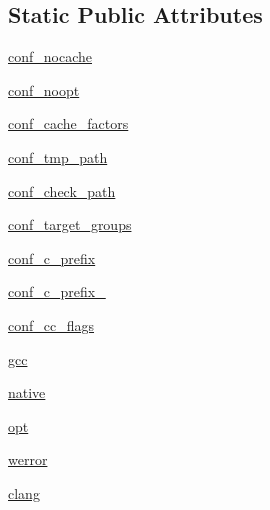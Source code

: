 \subsection*{Static Public Attributes}
\begin{DoxyCompactItemize}
\item 
\hyperlink{classnumpy_1_1distutils_1_1ccompiler__opt_1_1__Config_adad93aadb13906d28d4e25471d1e56f7}{conf\+\_\+nocache}
\item 
\hyperlink{classnumpy_1_1distutils_1_1ccompiler__opt_1_1__Config_a1d68534c2dbc6347af18677ea9754cda}{conf\+\_\+noopt}
\item 
\hyperlink{classnumpy_1_1distutils_1_1ccompiler__opt_1_1__Config_aa470e6069d1d9c574db056618517f95b}{conf\+\_\+cache\+\_\+factors}
\item 
\hyperlink{classnumpy_1_1distutils_1_1ccompiler__opt_1_1__Config_a6b6fb7f436d9313e96e8ed859c8d65b4}{conf\+\_\+tmp\+\_\+path}
\item 
\hyperlink{classnumpy_1_1distutils_1_1ccompiler__opt_1_1__Config_ad027d68dd3fd12a9d8e50ffe74201df3}{conf\+\_\+check\+\_\+path}
\item 
\hyperlink{classnumpy_1_1distutils_1_1ccompiler__opt_1_1__Config_a9c400a58b8140c1ff060a407017ed27d}{conf\+\_\+target\+\_\+groups}
\item 
\hyperlink{classnumpy_1_1distutils_1_1ccompiler__opt_1_1__Config_a19d234579af3f37af3ce69ef20f9bc3d}{conf\+\_\+c\+\_\+prefix}
\item 
\hyperlink{classnumpy_1_1distutils_1_1ccompiler__opt_1_1__Config_ae498ea8a22ea869f583d7793552b26f1}{conf\+\_\+c\+\_\+prefix\+\_\+}
\item 
\hyperlink{classnumpy_1_1distutils_1_1ccompiler__opt_1_1__Config_a87fbdb0b4f11781c7cfa8586eb663108}{conf\+\_\+cc\+\_\+flags}
\item 
\hyperlink{classnumpy_1_1distutils_1_1ccompiler__opt_1_1__Config_acb8ef51fb1ae28c2682ca8cdc6f14b9f}{gcc}
\item 
\hyperlink{classnumpy_1_1distutils_1_1ccompiler__opt_1_1__Config_aa2709e65e7ccaeb9546fd63756071918}{native}
\item 
\hyperlink{classnumpy_1_1distutils_1_1ccompiler__opt_1_1__Config_a59f09a7096af1a0e7dde1a6d32864af1}{opt}
\item 
\hyperlink{classnumpy_1_1distutils_1_1ccompiler__opt_1_1__Config_a0c22cc6fee3937973d40abf02a526eb8}{werror}
\item 
\hyperlink{classnumpy_1_1distutils_1_1ccompiler__opt_1_1__Config_a80b9364a3adbe15353e919e5c7864b55}{clang}
\item 

\end{DoxyCompactItemize}
